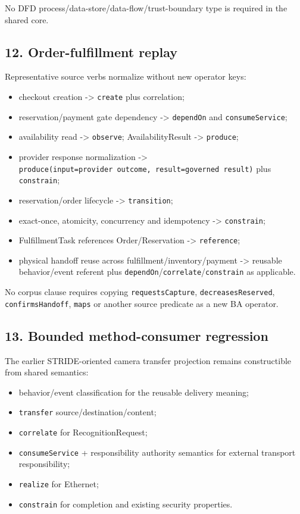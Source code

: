 \documentclass[
  10pt,
  a4paper,
]{article}
\providecommand{\tightlist}{%
  \setlength{\itemsep}{0pt}\setlength{\parskip}{0pt}}
\begin{document}
No DFD process/data-store/data-flow/trust-boundary type is required in
the shared core.

\subsection{12. Order-fulfillment
replay}\label{12-order-fulfillment-replay}

Representative source verbs normalize without new operator keys:

\begin{itemize}
\tightlist
\item
  checkout creation -\textgreater{} \texttt{create} plus correlation;
\item
  reservation/payment gate dependency -\textgreater{} \texttt{dependOn}
  and \texttt{consumeService};
\item
  availability read -\textgreater{} \texttt{observe}; AvailabilityResult
  -\textgreater{} \texttt{produce};
\item
  provider response normalization -\textgreater{}
  \texttt{produce(input=provider\ outcome,\ result=governed\ result)}
  plus \texttt{constrain};
\item
  reservation/order lifecycle -\textgreater{} \texttt{transition};
\item
  exact-once, atomicity, concurrency and idempotency -\textgreater{}
  \texttt{constrain};
\item
  FulfillmentTask references Order/Reservation -\textgreater{}
  \texttt{reference};
\item
  physical handoff reuse across fulfillment/inventory/payment
  -\textgreater{} reusable behavior/event referent plus
  \texttt{dependOn}/\texttt{correlate}/\texttt{constrain} as applicable.
\end{itemize}

No corpus clause requires copying \texttt{requestsCapture},
\texttt{decreasesReserved}, \texttt{confirmsHandoff}, \texttt{maps} or
another source predicate as a new BA operator.

\subsection{13. Bounded method-consumer
regression}\label{13-bounded-method-consumer-regression}

The earlier STRIDE-oriented camera transfer projection remains
constructible from shared semantics:

\begin{itemize}
\tightlist
\item
  behavior/event classification for the reusable delivery meaning;
\item
  \texttt{transfer} source/destination/content;
\item
  \texttt{correlate} for RecognitionRequest;
\item
  \texttt{consumeService} + responsibility authority semantics for
  external transport responsibility;
\item
  \texttt{realize} for Ethernet;
\item
  \texttt{constrain} for completion and existing security properties.
\end{itemize}
\end{document}
